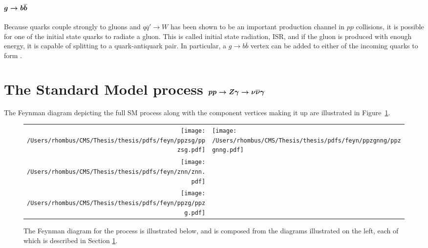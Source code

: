  \subsection[\gbb]
 {$\boldsymbol{g\rightarrow b\overline{b}}$}
  Because quarks couple strongly to gluons
   and $q\overline{q}'\rightarrow W$ has been shown to be
   an important production channel in $pp$ collisions,
   it is possible for one of the
   initial state quarks to radiate a gluon.
  This is called initial state radiation, ISR,
   and if the gluon is produced with enough energy,
   it is capable of splitting to a quark-antiquark pair.
  In particular, a $g\rightarrow b\overline{b}$ vertex
   can be added to either of the incoming quarks to 
   form \ppwbblnbb.
  
  
%
%

\section[The Standard Model process \ppzgnng]
        {The Standard Model process $\boldsymbol{pp\rightarrow Z\gamma\rightarrow\nu\overline{\nu}\gamma}$} \label{sec:znngproduction}

The Feynman diagram depicting the full SM process \ppzgnng 
 along with the component vertices making it up
 are illustrated in Figure~\ref{fig:ppzgnngfeyn}.

\begin{figure}[!h]
 \center
 \caption[Feynman diagrams for \ppzgnng]{
  The Feynman diagram for the process
   \ppzgnng is illustrated below,
   and is composed from the diagrams 
   illustrated on the left, each of which is
   described in Section \ref{sec:znngproduction}.
 } 
\begin{tabular}{rl}
 \texttt{[image: /Users/rhombus/CMS/Thesis/thesis/pdfs/feyn/ppzsg/ppzsg.pdf]} & 
 \multirow{3}{*}{\texttt{[image: /Users/rhombus/CMS/Thesis/thesis/pdfs/feyn/ppzgnng/ppzgnng.pdf]}} \\
 \texttt{[image: /Users/rhombus/CMS/Thesis/thesis/pdfs/feyn/znn/znn.pdf]} & {} \\
 \texttt{[image: /Users/rhombus/CMS/Thesis/thesis/pdfs/feyn/ppzg/ppzg.pdf]} & {} 
\end{tabular} 
    \label{fig:ppzgnngfeyn}
\end{figure}

